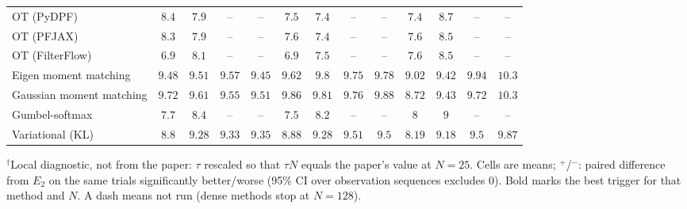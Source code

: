 \begin{table}[ht]
\begin{adjustbox}{max width=\linewidth}
\begin{tabular}{lcccc|cccc|cccc}
OT (PyDPF) & $8.4$ & $7.9$ & -- & -- & $7.5$ & $7.4$ & -- & -- & $7.4$ & $8.7$ & -- & -- \\
OT (PFJAX) & $8.3$ & $7.9$ & -- & -- & $7.6$ & $7.4$ & -- & -- & $7.6$ & $8.5$ & -- & -- \\
OT (FilterFlow) & $6.9$ & $8.1$ & -- & -- & $6.9$ & $7.5$ & -- & -- & $7.6$ & $8.5$ & -- & -- \\
Eigen moment matching & $9.48$ & $9.51$ & $9.57$ & $9.45$ & $9.62$ & $9.8$ & $9.75$ & $9.78$ & $9.02$ & $9.42$ & $9.94$ & $10.3$ \\
Gaussian moment matching & $9.72$ & $9.61$ & $9.55$ & $9.51$ & $9.86$ & $9.81$ & $9.76$ & $9.88$ & $8.72$ & $9.43$ & $9.72$ & $10.3$ \\
Gumbel-softmax & $7.7$ & $8.4$ & -- & -- & $7.5$ & $8.2$ & -- & -- & $8$ & $9$ & -- & -- \\
Variational (KL) & $8.8$ & $9.28$ & $9.33$ & $9.35$ & $8.88$ & $9.28$ & $9.51$ & $9.5$ & $8.19$ & $9.18$ & $9.5$ & $9.87$ \\
\bottomrule
\end{tabular}
\end{adjustbox}
\par\smallskip\parbox{0.95\linewidth}{\footnotesize $^\dagger$Local diagnostic, not from the paper: $\tau$ rescaled so that $\tau N$ equals the paper's value at $N{=}25$. Cells are means; $^{+}$/$^{-}$: paired difference from $E_2$ on the same trials significantly better/worse (95\% CI over observation sequences excludes 0). Bold marks the best trigger for that method and $N$. A dash means not run (dense methods stop at $N{=}128$).}
\end{table}

